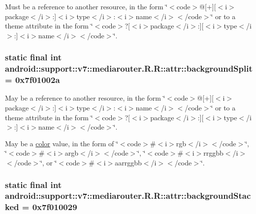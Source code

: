 Must be a reference to another resource, in the form \char`\"{}$<$code$>$@\mbox{[}+\mbox{]}\mbox{[}$<$i$>$package$<$/i$>$:\mbox{]}$<$i$>$type$<$/i$>$:$<$i$>$name$<$/i$>$$<$/code$>$\char`\"{} or to a theme attribute in the form \char`\"{}$<$code$>$?\mbox{[}$<$i$>$package$<$/i$>$:\mbox{]}\mbox{[}$<$i$>$type$<$/i$>$:\mbox{]}$<$i$>$name$<$/i$>$$<$/code$>$\char`\"{}. \hypertarget{classandroid_1_1support_1_1v7_1_1mediarouter_1_1_r_1_1attr_5d475492ada8d62600ca4ae68baccf12}{
\subsubsection[{backgroundSplit}]{\setlength{\rightskip}{0pt plus 5cm}static final int android::support::v7::mediarouter.R.R::attr::backgroundSplit = 0x7f01002a}}
\label{classandroid_1_1support_1_1v7_1_1mediarouter_1_1_r_1_1attr_5d475492ada8d62600ca4ae68baccf12}


May be a reference to another resource, in the form \char`\"{}$<$code$>$@\mbox{[}+\mbox{]}\mbox{[}$<$i$>$package$<$/i$>$:\mbox{]}$<$i$>$type$<$/i$>$:$<$i$>$name$<$/i$>$$<$/code$>$\char`\"{} or to a theme attribute in the form \char`\"{}$<$code$>$?\mbox{[}$<$i$>$package$<$/i$>$:\mbox{]}\mbox{[}$<$i$>$type$<$/i$>$:\mbox{]}$<$i$>$name$<$/i$>$$<$/code$>$\char`\"{}. 

May be a \hyperlink{classandroid_1_1support_1_1v7_1_1mediarouter_1_1_r_1_1color}{color} value, in the form of \char`\"{}$<$code$>$\#$<$i$>$rgb$<$/i$>$$<$/code$>$\char`\"{}, \char`\"{}$<$code$>$\#$<$i$>$argb$<$/i$>$$<$/code$>$\char`\"{}, \char`\"{}$<$code$>$\#$<$i$>$rrggbb$<$/i$>$$<$/code$>$\char`\"{}, or \char`\"{}$<$code$>$\#$<$i$>$aarrggbb$<$/i$>$$<$/code$>$\char`\"{}. \hypertarget{classandroid_1_1support_1_1v7_1_1mediarouter_1_1_r_1_1attr_34bbc10d4d0258fb299005b41d3decd3}{
\subsubsection[{backgroundStacked}]{\setlength{\rightskip}{0pt plus 5cm}static final int android::support::v7::mediarouter.R.R::attr::backgroundStacked = 0x7f010029}}
\label{classandroid_1_1support_1_1v7_1_1mediarouter_1_1_r_1_1attr_34bbc10d4d0258fb299005b41d3decd3}


